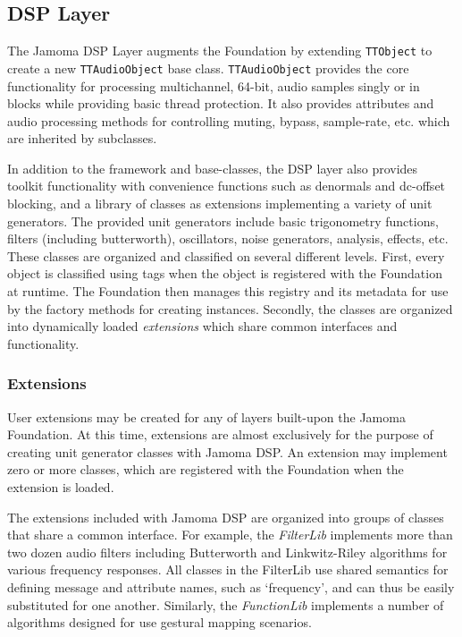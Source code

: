 \documentclass[twoside,10pt]{article}
\begin{document}


\subsection{DSP Layer} %

The Jamoma DSP Layer \cite{web9} augments the Foundation by extending \texttt{\small{TTObject}} to create a new \texttt{\small{TTAudioObject}} base class.  \texttt{\small{TTAudioObject}} provides the core functionality for processing multichannel, 64-bit, audio samples singly or in blocks while providing basic thread protection.  It also provides attributes and audio processing methods for controlling muting, bypass, sample-rate, etc. which are inherited by subclasses.

In addition to the framework and base-classes, the DSP layer also provides toolkit functionality with convenience functions such as denormals and dc-offset blocking, and a library of classes as extensions implementing a variety of unit generators.  The provided unit generators include basic trigonometry functions, filters (including butterworth), oscillators, noise generators, analysis, effects, etc.  These classes are organized and classified on several different levels.  First, every object is classified using tags when the object is registered with the Foundation at runtime.  The Foundation then manages this registry and its metadata for use by the factory methods for creating instances.  Secondly, the classes are organized into dynamically loaded \emph{extensions} which share common interfaces and functionality.

\subsubsection{Extensions}

User extensions may be created for any of layers built-upon the Jamoma Foundation.  At this time, extensions are almost exclusively for the purpose of creating unit generator classes with Jamoma DSP. An extension may implement zero or more classes, which are registered with the Foundation when the extension is loaded.

The extensions included with Jamoma DSP are organized into groups of classes that share a common interface.  For example, the \emph{FilterLib} implements more than two dozen audio filters including Butterworth and Linkwitz-Riley algorithms for various frequency responses.  All classes in the FilterLib use shared semantics for defining message and attribute names, such as `frequency', and can thus be easily substituted for one another.  Similarly, the \emph{FunctionLib} implements a number of algorithms designed for use gestural mapping scenarios.  
\end{document}
